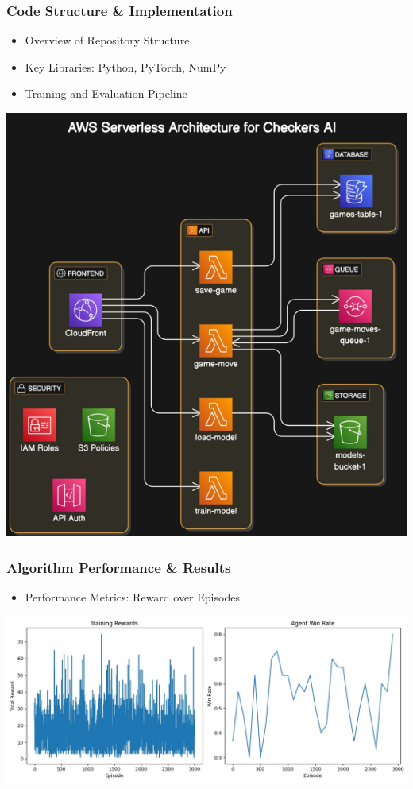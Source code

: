 \begin{frame}
    \frametitle{Code Structure \& Implementation}
    \begin{itemize}
        \item Overview of Repository Structure
        \item Key Libraries: Python, PyTorch, NumPy
        \item Training and Evaluation Pipeline
    \end{itemize}
    \centering
     \vspace{-1.5cm}
    \includegraphics[scale=0.5]{code_structure}
\end{frame}

\begin{frame}
    \frametitle{Algorithm Performance \& Results}
    \begin{itemize}
        \item Performance Metrics: Reward over Episodes
    \end{itemize}
    \centering
   \includegraphics[scale=0.6]{performance}
\end{frame}

